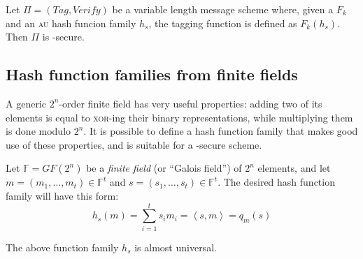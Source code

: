 \begin{corollary}
    Let $\Pi = (\textit{Tag}, \textit{Verify})$ be a variable length message \mac{} scheme where, given a \prf{} $F_k$ and an \textsc{au} hash funcion family $h_s$, the tagging function is defined as $F_k(h_s)$. Then $\Pi$ is \ufcma-secure.
\end{corollary}

\subsection{Hash function families from finite fields}


A generic $2^n$-order finite field has very useful properties: adding two of its elements is equal to \textsc{xor}-ing their binary representations, while multiplying them is done modulo $2^n$. It is possible to define a hash function family that makes good use of these properties, and is suitable for a \ufcma-secure \mac{} scheme.

\begin{construction}
    Let $\mathbb{F} = GF(2^n)$ be a \textit{finite field} (or ``Galois field'') of $2^n$ elements, and let $m = (m_1, \dots, m_t) \in \mathbb{F}^t$ and $s = (s_1, \dots, s_t) \in \mathbb{F}^t$. The desired hash function family will have this form:
    \[
        h_{s}(m)= \sum_{i = 1}^{t} s_i m_i = \left<s, m\right> = q_m(s)
    \]
\end{construction}

\begin{lemma}
    The above function family $h_s$ is almost universal.
\end{lemma}

